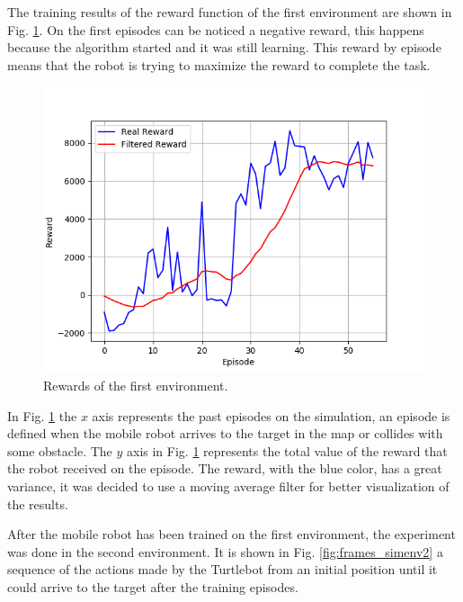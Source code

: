 The training results of the reward function of the first environment are shown in Fig. \ref{fig:stage_1}.
On the first episodes can be noticed a negative reward, this happens because the algorithm started and it was still learning.
This reward by episode means that the robot is trying to maximize the reward to complete the task.

\begin{figure}[htbp]
\centerline{\includegraphics[width=\columnwidth]{images/stage_1.png}}
\caption{Rewards of the first environment.}
\label{fig:stage_1}
\end{figure}

In Fig. \ref{fig:stage_1} the $x$ axis represents the past episodes on the simulation, an episode is defined when the mobile robot arrives to the target in the map or collides with some obstacle. 
The $y$ axis in Fig. \ref{fig:stage_1} represents the total value of the reward that the robot received on the episode.
The reward, with the blue color, has a great variance, it was decided to use a moving average filter for better visualization of the results.

After the mobile robot has been trained on the first environment, the experiment was done in the second environment.
It is shown in Fig. \ref{fig:frames_simenv2} a sequence of the actions made by the Turtlebot from an initial position until it could arrive to the target after the training episodes.

